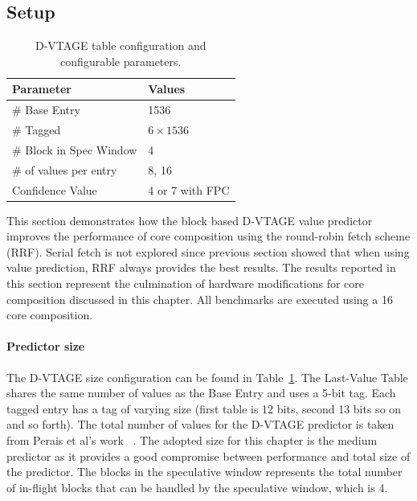 \subsection{Setup}

\begin{table}[t]
\small
\centering
\begin{tabular}{p{5.2cm} p{3cm}}
\toprule
\textbf{Parameter} & \textbf{Values} \\ \midrule
\# Base Entry & 1536\\
\# Tagged & $6\times1536$\\
\# Block in Spec Window & 4 \\ \hline \midrule
\# of values per entry & 8, 16\\
Confidence Value & 4 or 7 with FPC \\ \bottomrule
\end{tabular}
  \caption{D-VTAGE table configuration and configurable parameters.}\label{tab:vtage-conf}
\vspace{1em}
\end{table}

This section demonstrates how the block based D-VTAGE value predictor improves the performance of core composition using the round-robin fetch scheme (RRF).
Serial fetch is not explored since previous section showed that when using value prediction, RRF always provides the best results.
The results reported in this section represent the culmination of hardware modifications for core composition discussed in this chapter.
All benchmarks are executed using a 16 core composition.

\paragraph*{Predictor size}
The D-VTAGE size configuration can be found in Table~\ref{tab:vtage-conf}.
The Last-Value Table shares the same number of values as the Base Entry and uses a 5-bit tag.
Each tagged entry has a tag of varying size (first table is 12 bits, second 13 bits so on and so forth).
The total number of values for the D-VTAGE predictor is taken from Perais et al's work ~\cite{peraisBeBop2015}.
The adopted size for this chapter is the medium predictor as it provides a good compromise between performance and total size of the predictor.
The blocks in the speculative window represents the total number of in-flight blocks that can be handled by the speculative window, which is 4.


